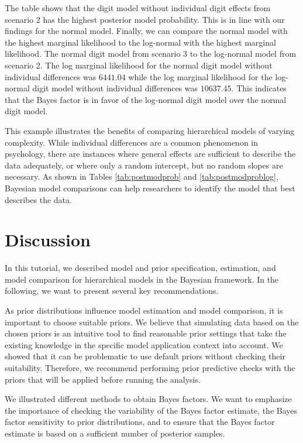 \documentclass[
  english,
  doc,floatsintext]{apa6}
\begin{document}
The table shows that the digit model without individual digit effects from scenario 2 has the highest posterior model probability. This is in line with our findings for the normal model. Finally, we can compare the normal model with the highest marginal likelihood to the log-normal with the highest marginal likelihood. The normal digit model from scenario 3 to the log-normal model from scenario 2. The log marginal likelihood for the normal digit model without individual differences was \(6441.04\) while the log marginal likelihood for the log-normal digit model without individual differences was \(10637.45\). This indicates that the Bayes factor is in favor of the log-normal digit model over the normal digit model.

This example illustrates the benefits of comparing hierarchical models of varying complexity. While individual differences are a common phenomenon in psychology, there are instances where general effects are sufficient to describe the data adequately, or where only a random intercept, but no random slopes are necessary. As shown in Tables \ref{tab:postmodprob} and \ref{tab:postmodproblog}, Bayesian model comparisons can help researchers to identify the model that best describes the data.

\hypertarget{discussion}{%
\section{Discussion}\label{discussion}}

In this tutorial, we described model and prior specification, estimation, and model comparison for hierarchical models in the Bayesian framework. In the following, we want to present several key recommendations.

As prior distributions influence model estimation and model comparison, it is important to choose suitable priors. We believe that simulating data based on the chosen priors is an intuitive tool to find reasonable prior settings that take the existing knowledge in the specific model application context into account. We showed that it can be problematic to use default priors without checking their suitability. Therefore, we recommend performing prior predictive checks with the priors that will be applied before running the analysis.

We illustrated different methods to obtain Bayes factors. We want to emphasize the importance of checking the variability of the Bayes factor estimate, the Bayes factor sensitivity to prior distributions, and to ensure that the Bayes factor estimate is based on a sufficient number of posterior samples.
\end{document}

